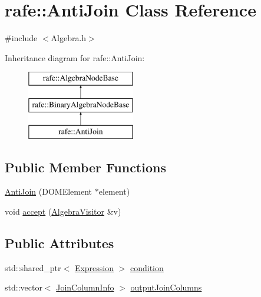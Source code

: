 \hypertarget{classrafe_1_1_anti_join}{\section{rafe\+:\+:Anti\+Join Class Reference}
\label{classrafe_1_1_anti_join}
}


{\ttfamily \#include $<$Algebra.\+h$>$}

Inheritance diagram for rafe\+:\+:Anti\+Join\+:\begin{figure}[H]
\begin{center}
\leavevmode
\includegraphics[height=3.000000cm]{classrafe_1_1_anti_join}
\end{center}
\end{figure}
\subsection*{Public Member Functions}
\begin{DoxyCompactItemize}
\item 
\hyperlink{classrafe_1_1_anti_join_a0f74edfc2442c9d091d15f4503702227}{Anti\+Join} (D\+O\+M\+Element $\ast$element)
\item 
void \hyperlink{classrafe_1_1_anti_join_a6f4599cefdf10f6966239a3307c98621}{accept} (\hyperlink{classrafe_1_1_algebra_visitor}{Algebra\+Visitor} \&v)
\end{DoxyCompactItemize}
\subsection*{Public Attributes}
\begin{DoxyCompactItemize}
\item 
std\+::shared\+\_\+ptr$<$ \hyperlink{classrafe_1_1_expression}{Expression} $>$ \hyperlink{classrafe_1_1_anti_join_a7eff7c54fb08dfefa4171080cd48fadc}{condition}
\item 
std\+::vector$<$ \hyperlink{classrafe_1_1_join_column_info}{Join\+Column\+Info} $>$ \hyperlink{classrafe_1_1_anti_join_a46d9e31d624610f99d6708fd5aee68be}{output\+Join\+Columns}
\end{DoxyCompactItemize}


